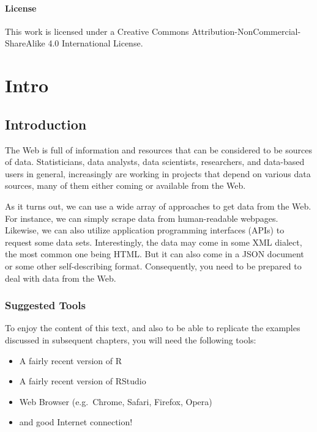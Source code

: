 \documentclass[
]{book}
\begin{document}
\hypertarget{license}{%
\subsection*{License}\label{license}}

This work is licensed under a Creative Commons Attribution-NonCommercial-ShareAlike 4.0 International License.

\hypertarget{part-intro}{%
\part{Intro}\label{part-intro}}

\hypertarget{introduction}{%
\chapter{Introduction}\label{introduction}}

The Web is full of information and resources that can be considered to be
sources of data. Statisticians, data analysts, data scientists, researchers,
and data-based users in general, increasingly are working in projects that
depend on various data sources, many of them either coming or available from the
Web.

As it turns out, we can use a wide array of approaches to get data from
the Web. For instance, we can simply scrape data from human-readable webpages.
Likewise, we can also utilize application programming interfaces (APIs) to
request some data sets. Interestingly, the data may come in some XML dialect,
the most common one being HTML. But it can also come in a JSON document or some
other self-describing format. Consequently, you need to be prepared to deal
with data from the Web.

\hypertarget{suggested-tools}{%
\section{Suggested Tools}\label{suggested-tools}}

To enjoy the content of this text, and also to be able to replicate the
examples discussed in subsequent chapters, you will need the following tools:

\begin{itemize}
\item
  A fairly recent version of R
\item
  A fairly recent version of RStudio
\item
  Web Browser (e.g.~Chrome, Safari, Firefox, Opera)
\item
  and good Internet connection!
\end{itemize}
\end{document}
